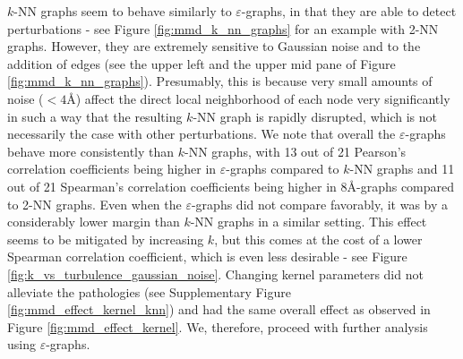 $k$-NN graphs seem to behave similarly to $\varepsilon$-graphs, in that they are
able to detect perturbations - see Figure \ref{fig:mmd_k_nn_graphs} for an
example with 2-NN graphs. However, they are extremely sensitive to Gaussian
noise and to the addition of edges (see the upper left and the upper mid pane of Figure
\ref{fig:mmd_k_nn_graphs}). Presumably, this is because very small amounts of
noise ($<4$\si{\angstrom}) affect the direct local neighborhood of each node
very significantly in such a way that the resulting $k$-NN graph is rapidly
disrupted, which is not necessarily the case with other perturbations. We note
that overall the $\varepsilon$-graphs behave more consistently than $k$-NN
graphs, with 13 out of 21 Pearson's correlation coefficients being higher in
$\varepsilon$-graphs compared to $k$-NN graphs and 11 out of 21 Spearman's
correlation coefficients being higher in 8\si{\angstrom}-graphs compared to 2-NN
graphs. Even when the $\varepsilon$-graphs did not compare favorably, it was by
a considerably lower margin than $k$-NN graphs in a similar setting. This effect
seems to be mitigated by increasing $k$, but this comes at the cost of a lower
Spearman correlation coefficient, which is even less desirable - see Figure
\ref{fig:k_vs_turbulence_gaussian_noise}. Changing kernel parameters did not
alleviate the pathologies (see Supplementary Figure
\ref{fig:mmd_effect_kernel_knn}) and had the same overall effect as observed in
Figure \ref{fig:mmd_effect_kernel}. We, therefore, proceed with further analysis
using $\varepsilon$-graphs.

